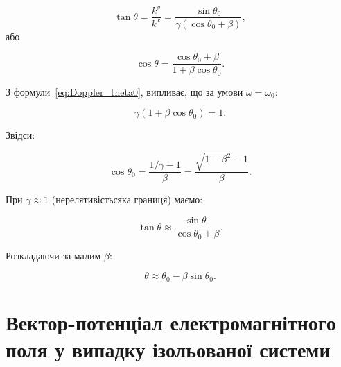 \begin{problem}
    \[
        \tan\theta = \frac{k^y}{k^x}
        = \frac{\sin\theta_0}{\gamma(\cos\theta_0+\beta)},
    \]
    або

    \[
        \cos\theta =
        \frac{\cos\theta_0+\beta}{1+\beta\cos\theta_0}.
    \]

    \medskip
    З формули~\eqref{eq:Doppler_theta0}, випливає, що за  умови $\omega = \omega_0$:

    \[
        \gamma(1 + \beta\cos\theta_0) = 1.
    \]

    Звідси:

    \[
        \cos\theta_0
        = \frac{1/\gamma - 1}{\beta}
        = \frac{\sqrt{1-\beta^2}-1}{\beta}.
    \]

    \medskip

    При $\gamma \approx 1$ (нерелятивістьсяка границя) маємо:

    \[
        \tan\theta \approx \frac{\sin\theta_0}{\cos\theta_0+\beta}.
    \]

    Розкладаючи за малим $\beta$:

    \[
        \theta \approx \theta_0 - \beta \sin\theta_0.
    \]
\end{problem}



\section{Вектор-потенціал електромагнітного поля у випадку ізольованої системи}

